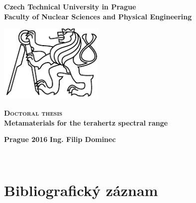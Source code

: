 \begin{center}
	\Large{\textbf{
Czech Technical University in Prague\\
Faculty of Nuclear Sciences and Physical Engineering\\ 
}}
 \vspace{3cm}

\includegraphics[width=5cm]{img/LogoCVUT}
\vspace{2cm}

\huge{\textbf{\scshape Doctoral thesis}}\\
\vspace{5mm}
{\LARGE\textbf{Metamaterials for the terahertz spectral range\\}}
\end{center}

\date{ } 			


 \vfill
\begin{minipage}{.99\textwidth}
\Large{\textbf{Prague 2016}} \hfill \Large{\textbf{Ing. Filip Dominec}}
\end{minipage}


\thispagestyle{empty} \newpage ~ \thispagestyle{empty} \newpage \setcounter{page}{1}

{\let\clearpage\relax\chapter*{Bibliografický záznam}}

